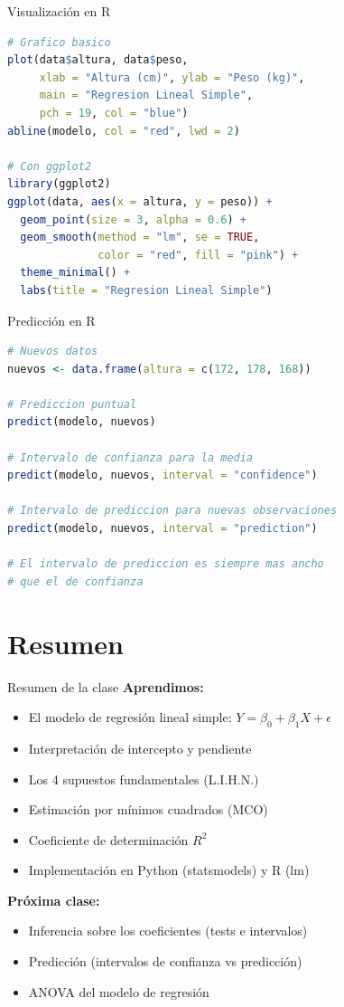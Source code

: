 \documentclass[aspectratio=169]{beamer}
\begin{document}
\begin{frame}[fragile]{Visualización en R}
\begin{lstlisting}[language=R]
# Grafico basico
plot(data$altura, data$peso, 
     xlab = "Altura (cm)", ylab = "Peso (kg)",
     main = "Regresion Lineal Simple",
     pch = 19, col = "blue")
abline(modelo, col = "red", lwd = 2)

# Con ggplot2
library(ggplot2)
ggplot(data, aes(x = altura, y = peso)) +
  geom_point(size = 3, alpha = 0.6) +
  geom_smooth(method = "lm", se = TRUE, 
              color = "red", fill = "pink") +
  theme_minimal() +
  labs(title = "Regresion Lineal Simple")
\end{lstlisting}
\end{frame}

\begin{frame}[fragile]{Predicción en R}
\begin{lstlisting}[language=R]
# Nuevos datos
nuevos <- data.frame(altura = c(172, 178, 168))

# Prediccion puntual
predict(modelo, nuevos)

# Intervalo de confianza para la media
predict(modelo, nuevos, interval = "confidence")

# Intervalo de prediccion para nuevas observaciones
predict(modelo, nuevos, interval = "prediction")

# El intervalo de prediccion es siempre mas ancho
# que el de confianza
\end{lstlisting}
\end{frame}

\section{Resumen}

\begin{frame}{Resumen de la clase}
\textbf{Aprendimos:}
\begin{itemize}
    \item El modelo de regresión lineal simple: $Y = \beta_0 + \beta_1 X + \epsilon$
    \item Interpretación de intercepto y pendiente
    \item Los 4 supuestos fundamentales (L.I.H.N.)
    \item Estimación por mínimos cuadrados (MCO)
    \item Coeficiente de determinación $R^2$
    \item Implementación en Python (statsmodels) y R (lm)
\end{itemize}

\vspace{0.5cm}
\textbf{Próxima clase:}
\begin{itemize}
    \item Inferencia sobre los coeficientes (tests e intervalos)
    \item Predicción (intervalos de confianza vs predicción)
    \item ANOVA del modelo de regresión
\end{itemize}
\end{frame}
\end{document}
